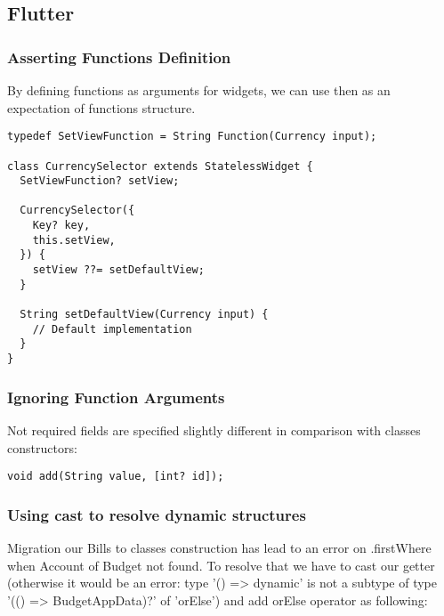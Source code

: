 
\subsection{Flutter}


\subsubsection{Asserting Functions Definition}

By defining functions as arguments for widgets, we can use then as an expectation of functions structure.

\begin{lstlisting}
typedef SetViewFunction = String Function(Currency input);

class CurrencySelector extends StatelessWidget {
  SetViewFunction? setView;

  CurrencySelector({
    Key? key,
    this.setView,
  }) {
    setView ??= setDefaultView;
  }

  String setDefaultView(Currency input) {
    // Default implementation
  }
}
\end{lstlisting}


\subsubsection{Ignoring Function Arguments}

Not required fields are specified slightly different in comparison with classes constructors:

\begin{lstlisting}
void add(String value, [int? id]);
\end{lstlisting}


\subsubsection{Using cast to resolve dynamic structures}

Migration our Bills to classes construction has lead to an error on .firstWhere when Account of Budget not found. 
To resolve that we have to cast our getter (otherwise it would be an error: type '() => dynamic' is not a subtype 
of type '(() => BudgetAppData)?' of 'orElse') and add orElse operator as following:

